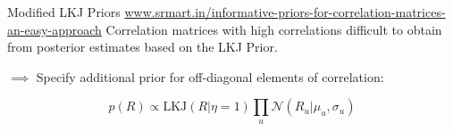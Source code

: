 \documentclass[usenames,dvipsnames]{beamer}
\theoremstyle{definition}
\begin{document}
\begin{frame}{Modified LKJ Priors}
    \url{www.srmart.in/informative-priors-for-correlation-matrices-an-easy-approach}
    Correlation matrices with high correlations difficult to obtain from posterior estimates based on the LKJ Prior.

    $\implies$ Specify additional prior for off-diagonal elements of correlation:

    $$p(R) \propto \text{LKJ}(R | \eta = 1)\prod_{u}\mathcal{N}(R_u | \mu_u, \sigma_u)$$
\end{frame}

\end{document}
